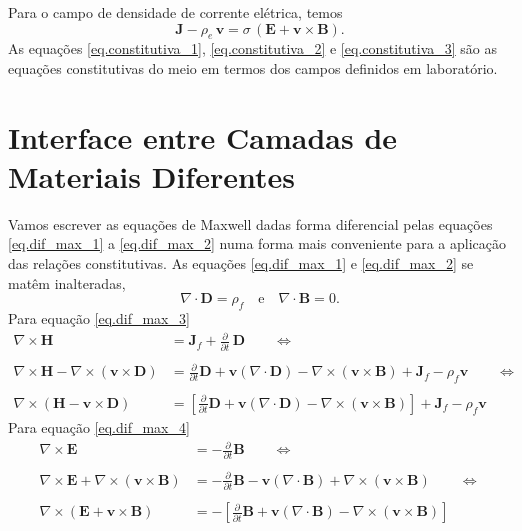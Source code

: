 Para o campo de densidade de corrente el\'etrica, temos
\begin{equation}\label{eq.constitutiva_3}
\mathbf{J}-\rho_e\,\mathbf{v}=\sigma\,(\mathbf{E}+\mathbf{v}\times\mathbf{B}).
\end{equation}
As equa\c{c}\~oes \ref{eq.constitutiva_1}, \ref{eq.constitutiva_2} e \ref{eq.constitutiva_3} s\~ao as equa\c{c}\~oes constitutivas do meio em termos dos campos definidos em laborat\'orio. 

\section{Interface entre Camadas de Materiais Diferentes}

Vamos escrever as equa\c{c}\~oes de Maxwell dadas forma diferencial pelas equa\c{c}\~oes \ref{eq.dif_max_1} a \ref{eq.dif_max_2} numa forma mais conveniente para a aplica\c{c}\~ao das rela\c{c}\~oes constitutivas. As equa\c{c}\~oes \ref{eq.dif_max_1} e \ref{eq.dif_max_2} se mat\^em inalteradas,
\begin{equation}\label{eq.div_D_div_B}
\nabla\cdot\mathbf{D}=\rho_f\quad\text{e}\quad\nabla\cdot\mathbf{B}=0.
\end{equation}
Para equa\c{c}\~ao \ref{eq.dif_max_3}
\begin{align}\label{eq.interface_1}\nonumber
\nabla\times\mathbf{H}&=\mathbf{J}_f+\frac{\partial}{\partial t}\,\mathbf{D}\qquad\Leftrightarrow\\\nonumber\\
\nabla\times\mathbf{H}-\nabla\times(\mathbf{v}\times\mathbf{D})&=\frac{\partial}{\partial t}\mathbf{D}+\mathbf{v}(\nabla\cdot\mathbf{D})-\nabla\times(\mathbf{v}\times\mathbf{B})+\mathbf{J}_f-\rho_f\mathbf{v}\qquad\Leftrightarrow\\\nonumber\\
\nabla\times(\mathbf{H}-\mathbf{v}\times\mathbf{D})&=\left[\frac{\partial}{\partial t}\mathbf{D}+\mathbf{v}(\nabla\cdot\mathbf{D})-\nabla\times(\mathbf{v}\times\mathbf{B})\right]+\mathbf{J}_f-\rho_f\mathbf{v}
\end{align}
Para equa\c{c}\~ao \ref{eq.dif_max_4}
\begin{align}\label{eq.interface_2}\nonumber
\nabla\times\mathbf{E}&=-\frac{\partial}{\partial t}\mathbf{B}\qquad\Leftrightarrow\\\nonumber\\
\nabla\times\mathbf{E}+\nabla\times(\mathbf{v}\times\mathbf{B})&=-\frac{\partial}{\partial t}\mathbf{B}-\mathbf{v}(\nabla\cdot\mathbf{B})+\nabla\times(\mathbf{v}\times\mathbf{B})\qquad\Leftrightarrow\\\nonumber\\
\nabla\times(\mathbf{E}+\mathbf{v}\times\mathbf{B})&=-\left[\frac{\partial}{\partial t}\mathbf{B}+\mathbf{v}(\nabla\cdot\mathbf{B})-\nabla\times(\mathbf{v}\times\mathbf{B})\right]
\end{align}
